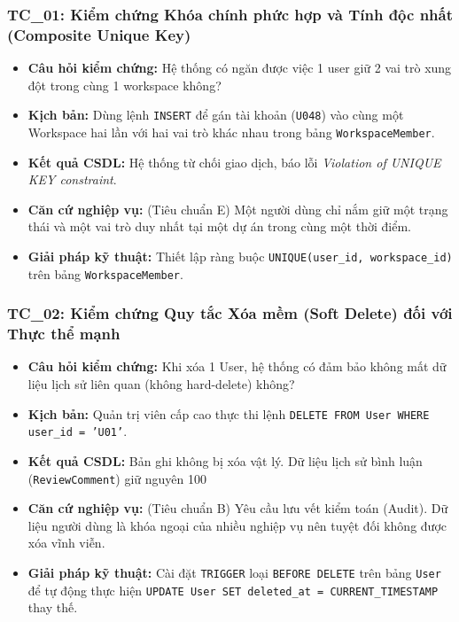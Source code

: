 \subsubsection*{TC\_01: Kiểm chứng Khóa chính phức hợp và Tính độc nhất (Composite Unique Key)}
\begin{itemize}
    \item \textbf{Câu hỏi kiểm chứng:} Hệ thống có ngăn được việc 1 user giữ 2 vai trò xung đột trong cùng 1 workspace không?
    \item \textbf{Kịch bản:} Dùng lệnh \texttt{INSERT} để gán tài khoản (\texttt{U048}) vào cùng một Workspace hai lần với hai vai trò khác nhau trong bảng \texttt{WorkspaceMember}.
    \item \textbf{Kết quả CSDL:} Hệ thống từ chối giao dịch, báo lỗi \textit{Violation of UNIQUE KEY constraint}.
    \item \textbf{Căn cứ nghiệp vụ:} (Tiêu chuẩn E) Một người dùng chỉ nắm giữ một trạng thái và một vai trò duy nhất tại một dự án trong cùng một thời điểm.
    \item \textbf{Giải pháp kỹ thuật:} Thiết lập ràng buộc \texttt{UNIQUE(user\_id, workspace\_id)} trên bảng \texttt{WorkspaceMember}.
\end{itemize}

\subsubsection*{TC\_02: Kiểm chứng Quy tắc Xóa mềm (Soft Delete) đối với Thực thể mạnh}
\begin{itemize}
    \item \textbf{Câu hỏi kiểm chứng:} Khi xóa 1 User, hệ thống có đảm bảo không mất dữ liệu lịch sử liên quan (không hard-delete) không?
    \item \textbf{Kịch bản:} Quản trị viên cấp cao thực thi lệnh \texttt{DELETE FROM User WHERE user\_id = 'U01'}.
    \item \textbf{Kết quả CSDL:} Bản ghi không bị xóa vật lý. Dữ liệu lịch sử bình luận (\texttt{ReviewComment}) giữ nguyên 100%
    \item \textbf{Căn cứ nghiệp vụ:} (Tiêu chuẩn B) Yêu cầu lưu vết kiểm toán (Audit). Dữ liệu người dùng là khóa ngoại của nhiều nghiệp vụ nên tuyệt đối không được xóa vĩnh viễn.
    \item \textbf{Giải pháp kỹ thuật:} Cài đặt \texttt{TRIGGER} loại \texttt{BEFORE DELETE} trên bảng \texttt{User} để tự động thực hiện \texttt{UPDATE User SET deleted\_at = CURRENT\_TIMESTAMP} thay thế.
\end{itemize}

